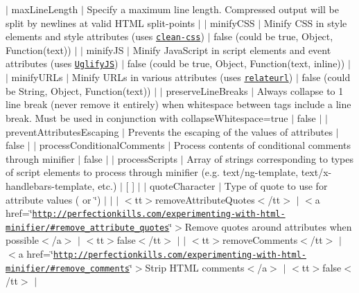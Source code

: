 $\vert$ {\ttfamily max\+Line\+Length} $\vert$ Specify a maximum line length. Compressed output will be split by newlines at valid H\+T\+ML split-\/points $\vert$ $\vert$ {\ttfamily minify\+C\+SS} $\vert$ Minify C\+SS in style elements and style attributes (uses \href{https://github.com/jakubpawlowicz/clean-css}{\tt clean-\/css}) $\vert$ {\ttfamily false} (could be {\ttfamily true}, {\ttfamily Object}, {\ttfamily Function(text)}) $\vert$ $\vert$ {\ttfamily minify\+JS} $\vert$ Minify Java\+Script in script elements and event attributes (uses \href{https://github.com/mishoo/UglifyJS2}{\tt Uglify\+JS}) $\vert$ {\ttfamily false} (could be {\ttfamily true}, {\ttfamily Object}, {\ttfamily Function(text, inline)}) $\vert$ $\vert$ {\ttfamily minify\+U\+R\+Ls} $\vert$ Minify U\+R\+Ls in various attributes (uses \href{https://github.com/stevenvachon/relateurl}{\tt relateurl}) $\vert$ {\ttfamily false} (could be {\ttfamily String}, {\ttfamily Object}, {\ttfamily Function(text)}) $\vert$ $\vert$ {\ttfamily preserve\+Line\+Breaks} $\vert$ Always collapse to 1 line break (never remove it entirely) when whitespace between tags include a line break. Must be used in conjunction with {\ttfamily collapse\+Whitespace=true} $\vert$ {\ttfamily false} $\vert$ $\vert$ {\ttfamily prevent\+Attributes\+Escaping} $\vert$ Prevents the escaping of the values of attributes $\vert$ {\ttfamily false} $\vert$ $\vert$ {\ttfamily process\+Conditional\+Comments} $\vert$ Process contents of conditional comments through minifier $\vert$ {\ttfamily false} $\vert$ $\vert$ {\ttfamily process\+Scripts} $\vert$ Array of strings corresponding to types of script elements to process through minifier (e.\+g. {\ttfamily text/ng-\/template}, {\ttfamily text/x-\/handlebars-\/template}, etc.) $\vert$ {\ttfamily \mbox{[} \mbox{]}} $\vert$ $\vert$ {\ttfamily quote\+Character} $\vert$ Type of quote to use for attribute values (\textquotesingle{} or \char`\"{}) $\vert$ $\vert$
$\vert$ $<$tt$>$remove\+Attribute\+Quotes$<$/tt$>$        $\vert$ $<$a href=\char`\"{}\href{http://perfectionkills.com/experimenting-with-html-minifier/#remove_attribute_quotes}{\tt http\+://perfectionkills.\+com/experimenting-\/with-\/html-\/minifier/\#remove\+\_\+attribute\+\_\+quotes}\char`\"{}$>$\+Remove quotes around attributes when possible$<$/a$>$ $\vert$ $<$tt$>$false$<$/tt$>$ $\vert$
$\vert$ $<$tt$>$remove\+Comments$<$/tt$>$               $\vert$ $<$a href=\char`\"{}\href{http://perfectionkills.com/experimenting-with-html-minifier/#remove_comments}{\tt http\+://perfectionkills.\+com/experimenting-\/with-\/html-\/minifier/\#remove\+\_\+comments}\char`\"{}$>$\+Strip H\+T\+M\+L comments$<$/a$>$ $\vert$ $<$tt$>$false$<$/tt$>$ $\vert$
